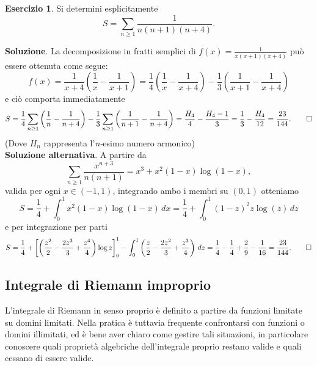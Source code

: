 \documentclass[a4paper,twoside]{article}
\theoremstyle{definition}
\newtheorem{ex}[theorem]{Esercizio}
\numberwithin{theorem}{section}
\begin{document}
\begin{ex} Si determini esplicitamente 
$$ S=\sum_{n\geq 1}\frac{1}{n(n+1)(n+4)}.$$
\end{ex}
\textbf{Soluzione}. La decomposizione in fratti semplici di $f(x)=\frac{1}{x(x+1)(x+4)}$ può essere ottenuta come segue:
$$ f(x)=\frac{1}{x+4}\left(\frac{1}{x}-\frac{1}{x+1}\right) = \frac{1}{4}\left(\frac{1}{x}-\frac{1}{x+4}\right)-\frac{1}{3}\left(\frac{1}{x+1}-\frac{1}{x+4}\right) $$
e ciò comporta immediatamente 
$$ S = \frac{1}{4}\sum_{n\geq 1}\left(\frac{1}{n}-\frac{1}{n+4}\right)-\frac{1}{3}\sum_{n\geq 1}\left(\frac{1}{n+1}-\frac{1}{n+4}\right) = \frac{H_4}{4}-\frac{H_4-1}{3} = \frac{1}{3}-\frac{H_4}{12} = \frac{23}{144}.\qed$$
(Dove $H_n$ rappresenta l'\emph{n-}esimo numero armonico)\\

\textbf{Soluzione alternativa}. A partire da 
$$ \sum_{n\geq 1}\frac{x^{n+3}}{n(n+1)} = x^3+x^2(1-x)\log(1-x), $$
valida per ogni $x\in(-1,1)$, integrando ambo i membri su $(0,1)$ otteniamo 
$$ S = \frac{1}{4}+\int_{0}^{1}x^2(1-x)\log(1-x)\,dx = \frac{1}{4}+\int_{0}^{1}(1-z)^2 z \log(z)\,dz  $$
e per integrazione per parti 
$$ S = \frac{1}{4}+\left[\left(\frac{z^2}{2}-\frac{2z^3}{3}+\frac{z^4}{4}\right)\log z\right]_{0}^{1}-\int_{0}^{1}\left(\frac{z}{2}-\frac{2z^2}{3}+\frac{z^3}{4}\right)\,dz=\frac{1}{4}-\frac{1}{4}+\frac{2}{9}-\frac{1}{16} = \frac{23}{144}.\qed$$


\subsection{Integrale di Riemann improprio}
L'integrale di Riemann in senso proprio è definito a partire da funzioni limitate su domini limitati. Nella pratica è tuttavia frequente confrontarsi con funzioni o domini illimitati, ed è bene aver chiaro come gestire tali situazioni, in particolare conoscere quali proprietà algebriche dell'integrale proprio restano valide e quali cessano di essere valide.\\
\end{document}

